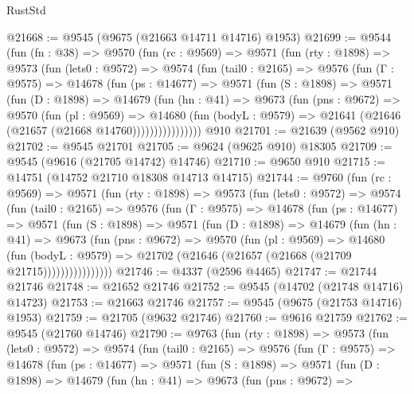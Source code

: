 \begin{lexlean}{RustStd}
\begin{coremodule}
@21668 := @9545 (@9675 (@21663 @14711 @14716) @1953)
@21699 := @9544
    (fun (fn : @38) =>
    @9570
      (fun (rc : @9569) =>
      @9571
        (fun (rty : @1898) =>
        @9573
          (fun (lets0 : @9572) =>
          @9574
            (fun (tail0 : @2165) =>
            @9576
              (fun (Γ : @9575) =>
              @14678
                (fun (ps : @14677) =>
                @9571
                  (fun (S : @1898) =>
                  @9571
                    (fun (D : @1898) =>
                    @14679
                      (fun (hn : @41) =>
                      @9673
                        (fun (pns : @9672) =>
                        @9570
                          (fun (pl : @9569) =>
                          @14680
                            (fun (bodyL : @9579) =>
                            @21641 (@21646 (@21657 (@21668 @14760))))))))))))))))
    @910
@21701 := @21639 (@9562 @910)
@21702 := @9545 @21701
@21705 := @9624 (@9625 @910) @18305
@21709 := @9545 (@9616 (@21705 @14742) @14746)
@21710 := @9650 @910
@21715 := @14751 (@14752 @21710 @18308 @14713 @14715)
@21744 := @9760
    (fun (rc : @9569) =>
    @9571
      (fun (rty : @1898) =>
      @9573
        (fun (lets0 : @9572) =>
        @9574
          (fun (tail0 : @2165) =>
          @9576
            (fun (Γ : @9575) =>
            @14678
              (fun (ps : @14677) =>
              @9571
                (fun (S : @1898) =>
                @9571
                  (fun (D : @1898) =>
                  @14679
                    (fun (hn : @41) =>
                    @9673
                      (fun (pns : @9672) =>
                      @9570
                        (fun (pl : @9569) =>
                        @14680
                          (fun (bodyL : @9579) =>
                          @21702 (@21646 (@21657 (@21668 (@21709 @21715))))))))))))))))
@21746 := @4337 (@2596 @4465)
@21747 := @21744 @21746
@21748 := @21652 @21746
@21752 := @9545 (@14702 (@21748 @14716) @14723)
@21753 := @21663 @21746
@21757 := @9545 (@9675 (@21753 @14716) @1953)
@21759 := @21705 (@9632 @21746)
@21760 := @9616 @21759
@21762 := @9545 (@21760 @14746)
@21790 := @9763
    (fun (rty : @1898) =>
    @9573
      (fun (lets0 : @9572) =>
      @9574
        (fun (tail0 : @2165) =>
        @9576
          (fun (Γ : @9575) =>
          @14678
            (fun (ps : @14677) =>
            @9571
              (fun (S : @1898) =>
              @9571
                (fun (D : @1898) =>
                @14679
                  (fun (hn : @41) =>
                  @9673
                    (fun (pns : @9672) =>

\end{coremodule}
\end{lexlean}
